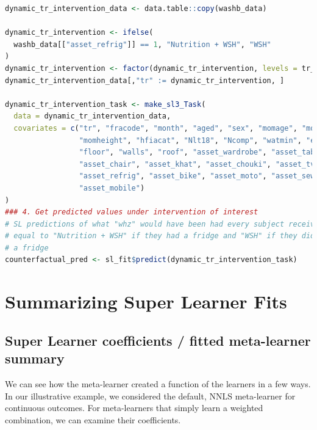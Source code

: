 \documentclass[
  12pt, krantz2,
]{krantz}
\newcommand{\1}{\mathbbm{1}}
\theoremstyle{definition}
\theoremstyle{definition}
\theoremstyle{definition}
\theoremstyle{definition}
\theoremstyle{remark}
\begin{document}
\begin{lstlisting}[language=R]
dynamic_tr_intervention_data <- data.table::copy(washb_data) 

dynamic_tr_intervention <- ifelse(
  washb_data[["asset_refrig"]] == 1, "Nutrition + WSH", "WSH"
)
dynamic_tr_intervention <- factor(dynamic_tr_intervention, levels = tr_levels)
dynamic_tr_intervention_data[,"tr" := dynamic_tr_intervention, ]

dynamic_tr_intervention_task <- make_sl3_Task(
  data = dynamic_tr_intervention_data, 
  covariates = c("tr", "fracode", "month", "aged", "sex", "momage", "momedu", 
                 "momheight", "hfiacat", "Nlt18", "Ncomp", "watmin", "elec", 
                 "floor", "walls", "roof", "asset_wardrobe", "asset_table", 
                 "asset_chair", "asset_khat", "asset_chouki", "asset_tv", 
                 "asset_refrig", "asset_bike", "asset_moto", "asset_sewmach", 
                 "asset_mobile")
)
### 4. Get predicted values under intervention of interest
# SL predictions of what "whz" would have been had every subject received "tr" 
# equal to "Nutrition + WSH" if they had a fridge and "WSH" if they didn't have 
# a fridge
counterfactual_pred <- sl_fit$predict(dynamic_tr_intervention_task)
\end{lstlisting}

\hypertarget{summarizing-super-learner-fits}{%
\section{Summarizing Super Learner Fits}\label{summarizing-super-learner-fits}}

\hypertarget{super-learner-coefficients-fitted-meta-learner-summary}{%
\subsection{Super Learner coefficients / fitted meta-learner summary}\label{super-learner-coefficients-fitted-meta-learner-summary}}

We can see how the meta-learner created a function of the learners in a few
ways. In our illustrative example, we considered the default, NNLS meta-learner
for continuous outcomes. For meta-learners that simply learn a weighted
combination, we can examine their coefficients.
\end{document}
